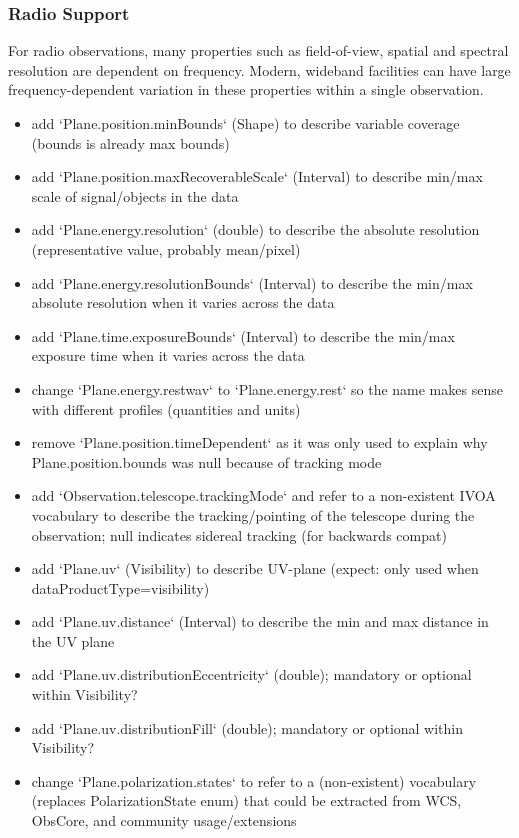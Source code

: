 \documentclass[11pt,a4paper]{ivoa}
\begin{document}
\subsubsection{Radio Support}

For radio observations, many properties such as field-of-view, spatial and spectral resolution are dependent on frequency. Modern, wideband facilities can have large frequency-dependent variation in these properties within a single observation.
\begin{itemize}
\item add `Plane.position.minBounds` (Shape) to describe variable coverage (bounds is already max bounds)

\item add `Plane.position.maxRecoverableScale` (Interval) to describe min/max scale of signal/objects in the data

\item add `Plane.energy.resolution` (double) to describe the absolute resolution (representative value, probably mean/pixel)

\item add `Plane.energy.resolutionBounds` (Interval) to describe the min/max absolute resolution when it varies across the data

\item add `Plane.time.exposureBounds` (Interval) to describe the min/max exposure time when it varies across the data

\item change `Plane.energy.restwav` to `Plane.energy.rest` so the name makes sense with different profiles (quantities and units)

\item remove `Plane.position.timeDependent` as it was only used to explain why Plane.position.bounds was null because of tracking mode

\item add `Observation.telescope.trackingMode` and refer to a non-existent IVOA vocabulary to describe the 
  tracking/pointing of the telescope during the observation; null indicates sidereal tracking (for backwards compat)

\item add `Plane.uv` (Visibility) to describe UV-plane (expect: only used when dataProductType=visibility)

\item add `Plane.uv.distance` (Interval) to describe the min and max distance in the UV plane

\item add `Plane.uv.distributionEccentricity` (double); mandatory or optional within Visibility?

\item add `Plane.uv.distributionFill` (double); mandatory or optional within Visibility?

\item change `Plane.polarization.states` to refer to a (non-existent) vocabulary (replaces PolarizationState enum) that could be extracted from WCS, ObsCore, and community usage/extensions
\end{itemize}
\end{document}
